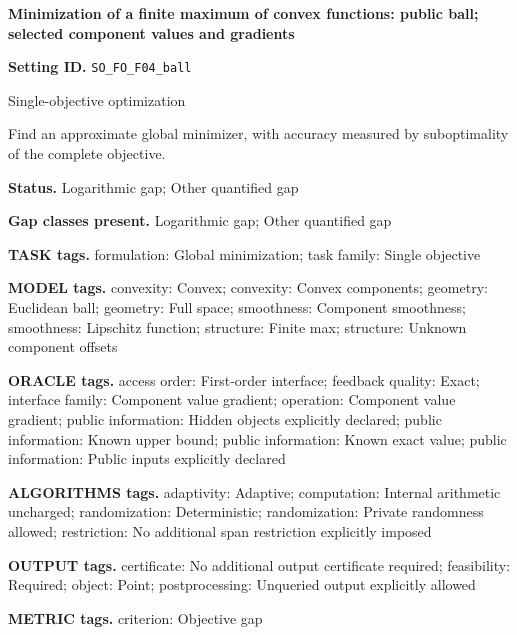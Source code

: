 \documentclass[10pt,a4paper]{article}
\begin{document}
\raggedright

{\LARGE\bfseries\sffamily\color{AtlasNavy} Minimization of a finite maximum of convex functions: public ball; selected component values and gradients\par}\vspace{5pt}


\textbf{Setting ID.} \texttt{SO\_\allowbreak{}FO\_\allowbreak{}F04\_\allowbreak{}ball}



Single-objective optimization



Find an approximate global minimizer, with accuracy measured by suboptimality of the complete objective.



\textbf{Status.} Logarithmic gap; Other quantified gap



\textbf{Gap classes present.} Logarithmic gap; Other quantified gap



\textbf{TASK tags.} formulation: Global minimization; task family: Single objective



\textbf{MODEL tags.} convexity: Convex; convexity: Convex components; geometry: Euclidean ball; geometry: Full space; smoothness: Component smoothness; smoothness: Lipschitz function; structure: Finite max; structure: Unknown component offsets



\textbf{ORACLE tags.} access order: First-order interface; feedback quality: Exact; interface family: Component value gradient; operation: Component value gradient; public information: Hidden objects explicitly declared; public information: Known upper bound; public information: Known exact value; public information: Public inputs explicitly declared



\textbf{ALGORITHMS tags.} adaptivity: Adaptive; computation: Internal arithmetic uncharged; randomization: Deterministic; randomization: Private randomness allowed; restriction: No additional span restriction explicitly imposed



\textbf{OUTPUT tags.} certificate: No additional output certificate required; feasibility: Required; object: Point; postprocessing: Unqueried output explicitly allowed



\textbf{METRIC tags.} criterion: Objective gap
\end{document}
